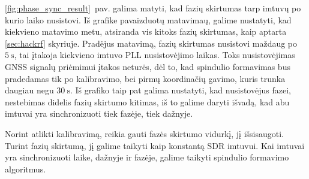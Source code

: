 \documentclass[main.tex]{subfiles}
\begin{document}
\ref{fig:phase_sync_result}~pav. galima matyti, kad fazių skirtumas tarp
imtuvų po kurio laiko nusistovi. Iš grafike pavaizduotų matavimaų,
galime nustatyti, kad kiekvieno matavimo metu, atsiranda vis kitoks fazių skirtumas,
kaip aptarta \ref{sec:hackrf} skyriuje.
Pradėjus matavimą, fazių skirtumas nusistovi maždaug po $5\ \mathrm{s}$, tai
įtakoja kiekvieno imtuvo PLL nusistovėjimo laikas. Toks nusistovėjimas
GNSS signalų priėmimui įtakos neturės, dėl to, kad spindulio formavimas
bus pradedamas tik po kalibravimo, bei pirmų koordinačių gavimo,
kuris trunka daugiau negu $30\ \mathrm{s}$.
Iš grafiko taip pat galima nustatyti, kad nusistovėjus fazei, nestebimas didelis fazių skirtumo
kitimas, iš to galime daryti išvadą, kad abu imtuvai yra sinchronizuoti tiek fazėje,
tiek dažnyje.

Norint atlikti kalibravimą, reikia gauti fazės skirtumo vidurkį, jį išsisaugoti.
Turint fazių skirtumą, jį galime taikyti kaip konstantą SDR imtuvui. Kai imtuvai
yra sinchronizuoti laike, dažnyje ir fazėje, galime taikyti spindulio formavimo
algoritmus.
\end{document}
